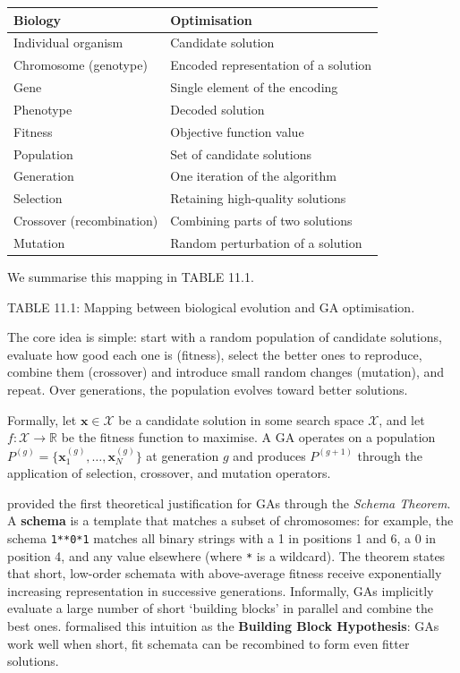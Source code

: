 \bigskip\noindent
\begin{tabular}{p{}p{}}
\toprule
Biology & Optimisation \\
\hline
Individual organism & Candidate solution \\
Chromosome (genotype) & Encoded representation of a solution \\
Gene & Single element of the encoding \\
Phenotype & Decoded solution \\
Fitness & Objective function value \\
Population & Set of candidate solutions \\
Generation & One iteration of the algorithm \\
Selection & Retaining high-quality solutions \\
Crossover (recombination) & Combining parts of two solutions \\
Mutation & Random perturbation of a solution \\
\bottomrule
\end{tabular}

\bigskip

We summarise this mapping in TABLE 11.1.

TABLE 11.1: Mapping between biological evolution and GA optimisation.

The core idea is simple: start with a random population of candidate solutions, evaluate how good each one is (fitness), select the better ones to reproduce, combine them (crossover) and introduce small random changes (mutation), and repeat. Over generations, the population evolves toward better solutions.

Formally, let $\mathbf{x} \in \mathcal{X}$ be a candidate solution in some search space $\mathcal{X}$, and let $f: \mathcal{X} \rightarrow \mathbb{R}$ be the fitness function to maximise. A GA operates on a population $P^{(g)} = \{\mathbf{x}_1^{(g)}, \ldots, \mathbf{x}_N^{(g)}\}$ at generation $g$ and produces $P^{(g+1)}$ through the application of selection, crossover, and mutation operators.

\cite{Holland1975} provided the first theoretical justification for GAs through the \textit{Schema Theorem}. A \textbf{schema} is a template that matches a subset of chromosomes: for example, the schema \texttt{1**0*1} matches all binary strings with a 1 in positions 1 and 6, a 0 in position 4, and any value elsewhere (where \texttt{*} is a wildcard). The theorem states that short, low-order schemata with above-average fitness receive exponentially increasing representation in successive generations. Informally, GAs implicitly evaluate a large number of short `building blocks' in parallel and combine the best ones. \cite{Goldberg1989} formalised this intuition as the \textbf{Building Block Hypothesis}: GAs work well when short, fit schemata can be recombined to form even fitter solutions.

